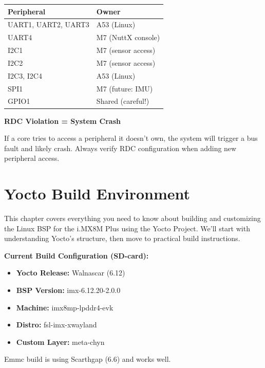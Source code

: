 \documentclass[12pt,a4paper]{report}
\begin{document}
\begin{center}
\begin{tabular}{|l|l|}
\hline
\textbf{Peripheral} & \textbf{Owner} \\
\hline
UART1, UART2, UART3 & A53 (Linux) \\
UART4 & M7 (NuttX console) \\
I2C1 & M7 (sensor access) \\
I2C2 & M7 (sensor access) \\
I2C3, I2C4 & A53 (Linux) \\
SPI1 & M7 (future: IMU) \\
GPIO1 & Shared (careful!) \\
\hline
\end{tabular}
\end{center}

\begin{important}
\textbf{RDC Violation = System Crash}

If a core tries to access a peripheral it doesn't own, the system will trigger a bus fault and likely crash. Always verify RDC configuration when adding new peripheral access.
\end{important}


\chapter{Yocto Build Environment}

This chapter covers everything you need to know about building and customizing the Linux BSP for the i.MX8M Plus using the Yocto Project. We'll start with understanding Yocto's structure, then move to practical build instructions.

\begin{important}
\textbf{Current Build Configuration (SD-card):}
\begin{itemize}
    \item \textbf{Yocto Release:} Walnascar (6.12)
    \item \textbf{BSP Version:} imx-6.12.20-2.0.0
    \item \textbf{Machine:} imx8mp-lpddr4-evk
    \item \textbf{Distro:} fsl-imx-xwayland
    \item \textbf{Custom Layer:} meta-chyn
\end{itemize}

Emmc build is using Scarthgap  (6.6)  and works well.
\end{important}
\end{document}
